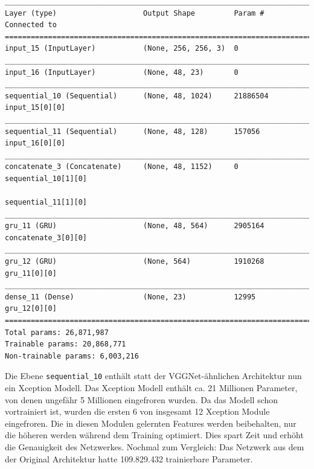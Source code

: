 \documentclass[pdftex,a4paper,halfparskip, article]{scrartcl}
\begin{document}
\begin{verbatim}
______________________________________________________________________________
Layer (type)                    Output Shape         Param #     Connected to                     
==============================================================================
input_15 (InputLayer)           (None, 256, 256, 3)  0                                            
______________________________________________________________________________
input_16 (InputLayer)           (None, 48, 23)       0                                            
______________________________________________________________________________
sequential_10 (Sequential)      (None, 48, 1024)     21886504    input_15[0][0]                   
______________________________________________________________________________
sequential_11 (Sequential)      (None, 48, 128)      157056      input_16[0][0]                   
______________________________________________________________________________
concatenate_3 (Concatenate)     (None, 48, 1152)     0           sequential_10[1][0]              
                                                                 sequential_11[1][0]              
______________________________________________________________________________
gru_11 (GRU)                    (None, 48, 564)      2905164     concatenate_3[0][0]              
______________________________________________________________________________
gru_12 (GRU)                    (None, 564)          1910268     gru_11[0][0]                     
______________________________________________________________________________
dense_11 (Dense)                (None, 23)           12995       gru_12[0][0]                     
==============================================================================
Total params: 26,871,987
Trainable params: 20,868,771
Non-trainable params: 6,003,216
\end{verbatim}

Die Ebene \texttt{sequential\_10} enthält statt der VGGNet-ähnlichen Architektur nun ein Xception Modell. Das Xception Modell enthält ca. 21 Millionen Parameter, von denen ungefähr 5 Millionen eingefroren wurden. Da das Modell schon vortrainiert ist, wurden die ersten 6 von insgesamt 12 Xception Module eingefroren. Die in diesen Modulen gelernten Features werden beibehalten, nur die höheren werden während dem Training optimiert. Dies spart Zeit und erhöht die Genauigkeit des Netzwerkes.
Nochmal zum Vergleich: Das Netzwerk aus dem der Original Architektur hatte 109.829.432 trainierbare Parameter.
\end{document}
